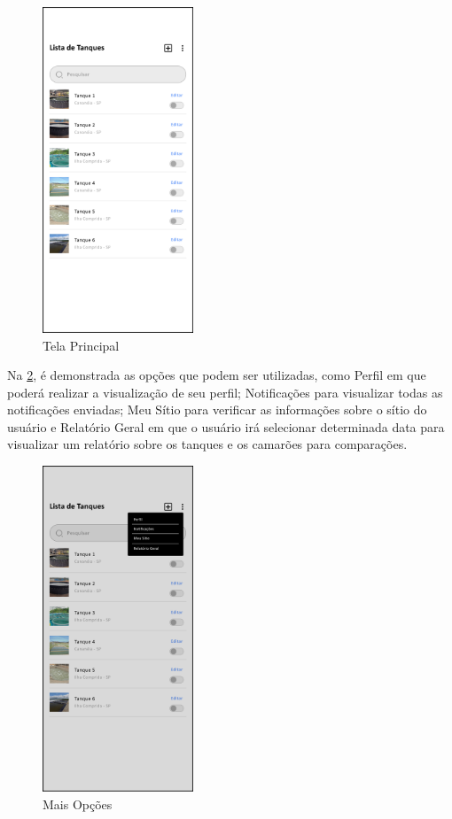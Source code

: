 \begin{figure}[!htb]
\centering
{}
\caption{Tela Principal}%
\label{fig:tela-principal}
\includegraphics[width = 0.4\textwidth]{Imagens/LISTA DE TANQUES.png}
\end{figure}

\newpage

Na \cref{fig:tela-opções}, é demonstrada as opções que podem ser utilizadas, como Perfil em que poderá realizar a visualização de seu perfil; Notificações para visualizar todas as notificações enviadas; Meu Sítio para verificar as informações sobre o sítio do usuário e Relatório Geral em que o usuário irá selecionar determinada data para visualizar um relatório sobre os tanques e os camarões para comparações.

\begin{figure}[!htb]
\centering
{}
\caption{Mais Opções}%
\label{fig:tela-opções}
\includegraphics[width = 0.4\textwidth]{Imagens/MAIS OPÇÕES.png}
\end{figure}


